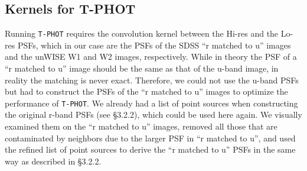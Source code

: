 \documentclass[apj,iop]{emulateapj}
\begin{document}
\subsection{Kernels for T-PHOT}




Running {\tt T-PHOT} requires the convolution kernel between the Hi-res and the Lo-res PSFs, which in our case are the PSFs of the SDSS ``r matched to u'' images and the unWISE W1 and W2 images, respectively. While in theory the PSF of a ``r matched to u'' image should be the same as that of the u-band image, in reality the matching is never exact. Therefore, we could not use the u-band PSFs but had to construct the PSFs of the ``r matched to u'' images to optimize the performance of {\tt T-PHOT}.  We already had a list of point sources when constructing the original r-band PSFs (see \S 3.2.2), which could be used here again. We visually examined them on the ``r matched to u'' images, removed all those that are contaminated by neighbors due to the larger PSF in ``r matched to u'', and used the refined list of point sources to derive the ``r matched to u'' PSFs in the same way as described in \S 3.2.2.
\end{document}
